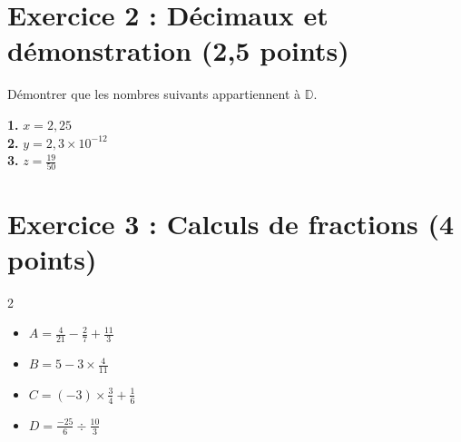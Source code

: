 \documentclass[12pt,a4paper]{article}
\begin{document}
\section*{Exercice 2 : D\'ecimaux et d\'emonstration (2,5 points)}
D\'emontrer que les nombres suivants appartiennent \`a \(\mathbb{D}\).
\begin{tcolorbox}[colframe=black, colback=white, width=\linewidth, height=6cm]
\textbf{1.} \(x = 2{,}25\) \\
\textbf{2.} \(y = 2{,}3 \times 10^{-12}\) \\
\textbf{3.} \(z = \frac{19}{50}\)
\end{tcolorbox}

\section*{Exercice 3 : Calculs de fractions (4 points)}
\begin{multicols}{2}
\begin{itemize}
    \item \(A = \frac{4}{21} - \frac{2}{7} + \frac{11}{3}\)
    \item \(B = 5 - 3 \times \frac{4}{11}\)
    \item \(C = (-3) \times \frac{3}{4} + \frac{1}{6}\)
    \item \(D = \frac{-25}{6} \div \frac{10}{3}\)
\end{itemize}
\end{multicols}
\vspace{-0.5cm}
\begin{tcolorbox}[colframe=black, colback=white, width=\linewidth, height=8cm]
\end{tcolorbox}
\end{document}
